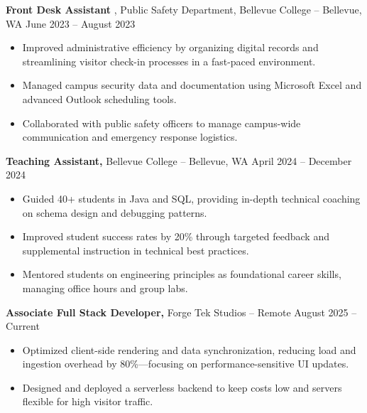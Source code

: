 \documentclass[11pt]{article}       %
\begin{document}
\textbf{Front Desk Assistant} {, Public Safety Department, Bellevue College} -- Bellevue, WA \hfill June 2023 -- August 2023 \\
\vspace{-9pt}
\begin{itemize}
  \item Improved administrative efficiency by organizing digital records and streamlining visitor check-in processes in a fast-paced environment.
  \item Managed campus security data and documentation using Microsoft Excel and advanced Outlook scheduling tools.
  \item Collaborated with public safety officers to manage campus-wide communication and emergency response logistics.
\end{itemize}

\textbf{Teaching Assistant,} {Bellevue College} -- Bellevue, WA \hfill April 2024 -- December 2024 \\
\vspace{-9pt}
\begin{itemize}
  \item Guided 40+ students in Java and SQL, providing in-depth technical coaching on schema design and debugging patterns.
  \item Improved student success rates by 20\% through targeted feedback and supplemental instruction in technical best practices.
  \item Mentored students on engineering principles as foundational career skills, managing office hours and group labs.
\end{itemize}

\textbf{Associate Full Stack Developer,} {Forge Tek Studios} -- Remote \hfill August 2025 -- Current 
\vspace{-9pt}
\begin{itemize}
  \item Optimized client-side rendering and data synchronization, reducing load and ingestion overhead by 80\%—focusing on performance-sensitive UI updates.
  \item Designed and deployed a serverless backend to keep costs low and servers flexible for high visitor traffic.
\end{itemize}
\end{document}
